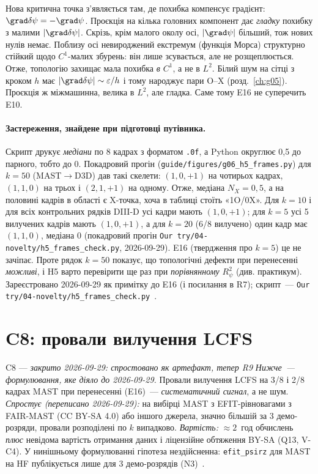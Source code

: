 \begin{derivation}
Нова критична точка з'являється там, де похибка компенсує градієнт: $\grad\delta\psi=-\grad\psi$. Проєкція на кілька головних компонент дає \emph{гладку} похибку з малими $|\grad\delta\psi|$. Скрізь, крім малого околу осі, $|\grad\psi|$ більший, тож нових нулів немає. Поблизу осі невироджений екстремум (функція Морса) структурно стійкий щодо $C^1$-малих збурень: він лише зсувається, але не розщеплюється. Отже, топологію захищає мала похибка \emph{в $C^1$}, а не в $L^2$. Білий шум на сітці з кроком $h$ має $|\grad\delta\psi|\sim\varepsilon/h$ і тому народжує пари O--X (розд.~\ref{ch:g05}). Проєкція ж міжмашинна, велика в $L^2$, але гладка. Саме тому E16 не суперечить E10.
\end{derivation}

\paragraph{Застереження, знайдене при підготовці путівника.} Скрипт друкує \emph{медіани} по 8 кадрах з форматом \texttt{.0f}, а Python округлює 0,5 до парного, тобто до 0. Покадровий прогін (\texttt{guide/figures/g06\_h5\_frames.py}) для $k=50$ (MAST$\to$D3D) дав такі скелети: $(1,0,{+1})$ на чотирьох кадрах, $(1,1,0)$ на трьох і $(2,1,{+1})$ на одному. Отже, медіана $N_X=0{,}5$, а на половині кадрів в області є X-точка, хоча в таблиці стоїть «1O/0X». Для $k=10$ і для всіх контрольних рядків DIII-D усі кадри мають $(1,0,{+1})$; для $k=5$ усі 5 вилучених кадрів мають $(1,0,{+1})$, а для $k=20$ (6/8 вилучено) один кадр має $(1,1,0)$, медіана 0 (покадровий прогін \texttt{Our try/04-novelty/h5\_frames\_check.py}, 2026-09-29). E16 (твердження про $k=5$) це не зачіпає. Проте рядок $k=50$ показує, що топологічні дефекти при перенесенні \emph{можливі}, і H5 варто перевірити ще раз при \emph{порівнянному} $R^2_\psi$ (див. практикум). Зареєстровано 2026-09-29 як примітку до E16 (і посилання в R7); скрипт~--- \texttt{Our try/04-novelty/h5\_frames\_check.py}~\cite{RegEst,RegLog}.

\section{C8: провали вилучення LCFS}\label{sec:g06-c8}

\begin{conjecture}{C8 --- \emph{закрито 2026-09-29: спростовано як артефакт, тепер R9}}
\emph{Нижче~--- формулювання, яке діяло до 2026-09-29.} Провали вилучення LCFS на 3/8 і 2/8 кадрах MAST при перенесенні (E16)~--- \emph{систематичний сигнал}, а не шум. \emph{Спростує (переписано 2026-09-29):} на вибірці MAST з EFIT-рівновагами з FAIR-MAST (CC BY-SA 4.0) або іншого джерела, значно більшій за 3 демо-розряди, провали розподілені по $k$ випадково. \emph{Вартість:} $\approx2$~год обчислень \emph{плюс} невідома вартість отримання даних і ліцензійне обтяження BY-SA (Q13, V-C4). У нинішньому формулюванні гіпотеза нездійсненна: \texttt{efit\_psirz} для MAST на HF публікується лише для 3 демо-розрядів (N3)~\cite{RegConj}.
\end{conjecture}

